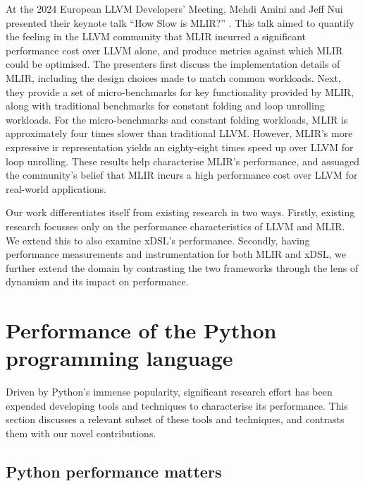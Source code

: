 At the 2024 European LLVM Developers' Meeting, Mehdi Amini and Jeff Nui presented their keynote talk ``How Slow is MLIR?'' \cite{aminiHowSlowMLIR2024}.
This talk aimed to quantify the feeling in the LLVM community that MLIR incurred a significant performance cost over LLVM alone, and produce metrics against which MLIR could be optimised.
The presenters first discuss the implementation details of MLIR, including the design choices made to match common workloads.
Next, they provide a set of micro-benchmarks for key functionality provided by MLIR, along with traditional benchmarks for constant folding and loop unrolling workloads. For the micro-benchmarks and constant folding workloads, MLIR is approximately four times slower than traditional LLVM. However, MLIR's more expressive \ac{ir} representation yields an eighty-eight times speed up over LLVM for loop unrolling.
These results help characterise MLIR's performance, and assuaged the community's belief that MLIR incurs a high performance cost over LLVM for real-world applications.


Our work differentiates itself from existing research in two ways.
Firstly, existing research focusses only on the performance characteristics of LLVM and MLIR. We extend this to also examine xDSL's performance.
Secondly, having performance measurements and instrumentation for both MLIR and xDSL, we further extend the domain by contrasting the two frameworks through the lens of dynamism and its impact on performance.






\section{Performance of the Python programming language}
\label{sec:python-performance}

Driven by Python's immense popularity, significant research effort has been expended developing tools and techniques to characterise its performance.
This section discusses a relevant subset of these tools and techniques, and contrasts them with our novel contributions.

\subsection{Python performance matters}
\label{ssec:python-performance-matters}

